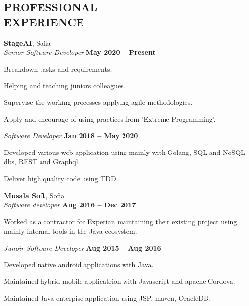 \documentclass[margin,line]{resume}
\begin{document}
\begin{resume}
    \section{\mysidestyle \textbf{\large{P}\small{ROFESSIONAL\\EXPERIENCE}}}

    \textbf{\listing StageAI}, Sofia \vspace{2mm}\\\vspace{1mm}%
    \textsl{Senior Software Developer} \hfill \textbf{May 2020 -- Present}\\
    \begin{list2}
        \item Breakdown tasks and requirements.
        \item Helping and teaching juniors colleagues.
	\item Supervise the working processes applying agile methodologies.
	\item Apply and encourage of using practices from 'Extreme Programming'. 
    \end{list2}

    \textsl{Software Developer} \hfill \textbf{Jan 2018 -- May 2020}\\
    \begin{list2}
        \item Developed various web application using mainly with Golang, SQL and NoSQL dbs, REST and Graphql.
	\item Deliver high quality code using TDD. 
    \end{list2}

    \textbf{\listing Musala Soft}, Sofia \vspace{2mm}\\\vspace{1mm}%
    \textsl{Software developer} \hfill \textbf{Aug 2016 -- Dec 2017}\\
    \begin{list2}
        \item Worked as a contractor for Experian maintaining their existing project using mainly internal tools in the Java ecosystem.
    \end{list2}

    \textsl{Junoir Software Developer} \hfill \textbf{Aug 2015 -- Aug 2016}\\
    \begin{list2}
        \item Developed native android applications with Java.
        \item Maintained hybrid mobile applicatrion with Javascript and apache Cordova.
	\item Maintained Java enterpise application using JSP, maven, OracleDB.  	
    \end{list2}


\end{resume}
\end{document}
